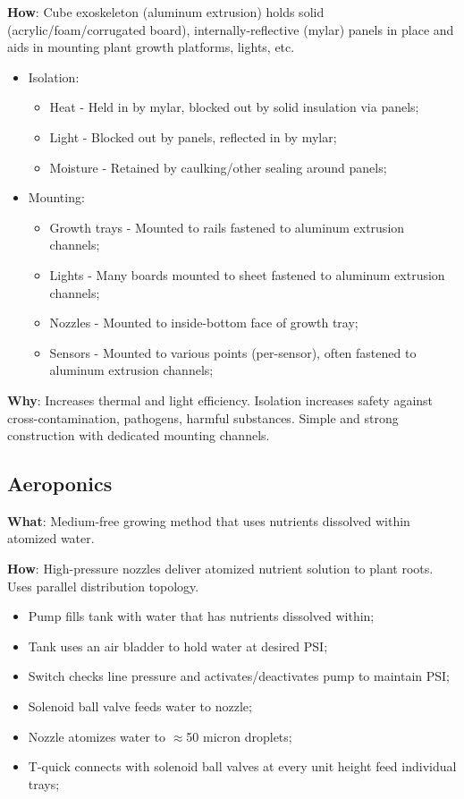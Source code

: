 \documentclass{report}
\begin{document}
\textbf{How}: Cube exoskeleton (aluminum extrusion) holds solid (acrylic/foam/corrugated board), internally-reflective (mylar) panels in place and aids in mounting plant growth platforms, lights, etc.
\begin{itemize}
    \item Isolation:
    \begin{itemize}
        \item Heat - Held in by mylar, blocked out by solid insulation via panels;
        \item Light - Blocked out by panels, reflected in by mylar;
        \item Moisture - Retained by caulking/other sealing around panels;
    \end{itemize}
    \item Mounting:
    \begin{itemize}
        \item Growth trays - Mounted to rails fastened to aluminum extrusion channels;
        \item Lights - Many boards mounted to sheet fastened to aluminum extrusion channels;
        \item Nozzles - Mounted to inside-bottom face of growth tray;
        \item Sensors - Mounted to various points (per-sensor), often fastened to aluminum extrusion channels;
    \end{itemize}
\end{itemize}

\textbf{Why}: Increases thermal and light efficiency. Isolation increases safety against cross-contamination, pathogens, harmful substances. Simple and strong construction with dedicated mounting channels.

\newpage

\subsection{Aeroponics}
\label{sec:aeroponics}

\textbf{What}: Medium-free growing method that uses nutrients dissolved within atomized water.

\textbf{How}: High-pressure nozzles deliver atomized nutrient solution to plant roots. Uses parallel distribution topology.
\begin{itemize}
    \item Pump fills tank with water that has nutrients dissolved within;
    \item Tank uses an air bladder to hold water at desired PSI;
    \item Switch checks line pressure and activates/deactivates pump to maintain PSI;
    \item Solenoid ball valve feeds water to nozzle;
    \item Nozzle atomizes water to $\approx$50 micron droplets;
    \item T-quick connects with solenoid ball valves at every unit height feed individual trays;
\end{itemize}
\end{document}
